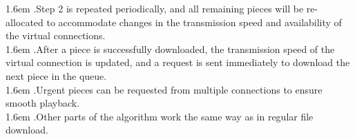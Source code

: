 \documentclass[10pt,a4paper]{article}
\begin{document}
\hangindent 1.6em
.\quad Step 2 is repeated periodically, and all remaining pieces will be re-allocated to accommodate changes in the transmission speed and availability of the virtual connections.
\vspace{-0.8em}
\\ 

\hangindent 1.6em
.\quad After a piece is successfully downloaded, the transmission speed of the virtual connection is updated, and a request is sent immediately to download the next piece in the queue.   
\vspace{-0.8em}
\\ 

\hangindent 1.6em
.\quad  Urgent pieces can be requested from multiple connections to ensure smooth playback.
\vspace{-0.8em}
\\ 

\hangindent 1.6em
.\quad  Other parts of the algorithm work the same way as in regular file download.
\vspace{-0.5em}
\\ 
\end{document}
